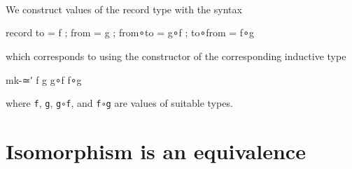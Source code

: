 \begin{fence}
\begin{code}
\>[0]\AgdaSpace{}%
\AgdaSymbol{(}\AgdaSpace{}%
\AgdaSpace{}%
\AgdaSpace{}%
\AgdaSpace{}%
\AgdaSymbol{)}\AgdaSpace{}%
\AgdaSymbol{=}\AgdaSpace{}%
\<%
\\
%
\\[\AgdaEmptyExtraSkip]%
\>[0]\AgdaSpace{}%
\AgdaSymbol{:}\AgdaSpace{}%
\AgdaSpace{}%
\AgdaSymbol{\{}\AgdaSpace{}%
\AgdaSpace{}%
\AgdaSymbol{:}\AgdaSpace{}%
\AgdaSymbol{\}}\AgdaSpace{}%
\AgdaSpace{}%
\AgdaSymbol{(}\AgdaSpace{}%
\AgdaSymbol{:}\AgdaSpace{}%
\AgdaSpace{}%
\AgdaSpace{}%
\AgdaSymbol{)}\AgdaSpace{}%
\AgdaSpace{}%
\AgdaSpace{}%
\AgdaSymbol{(}\AgdaSpace{}%
\AgdaSymbol{:}\AgdaSpace{}%
\AgdaSymbol{)}\AgdaSpace{}%
\AgdaSpace{}%
\AgdaSpace{}%
\AgdaSpace{}%
\AgdaSymbol{(}\AgdaSpace{}%
\AgdaSpace{}%
\AgdaSymbol{)}\AgdaSpace{}%
\AgdaSpace{}%
\AgdaSymbol{)}\<%
\\
\>[0]\AgdaSpace{}%
\AgdaSymbol{(}\AgdaSpace{}%
\AgdaSpace{}%
\AgdaSpace{}%
\AgdaSpace{}%
\AgdaSymbol{)}\AgdaSpace{}%
\AgdaSymbol{=}\AgdaSpace{}%
\<%
\end{code}
\end{fence}

We construct values of the record type with the syntax

\begin{myDisplay}
record
  { to    = f
  ; from  = g
  ; from∘to = g∘f
  ; to∘from = f∘g
  }
\end{myDisplay}

which corresponds to using the constructor of the corresponding
inductive type

\begin{myDisplay}
mk-≃′ f g g∘f f∘g
\end{myDisplay}

where \texttt{f}, \texttt{g}, \texttt{g∘f}, and \texttt{f∘g} are values
of suitable types.

\hypertarget{isomorphism-is-an-equivalence}{%
\section{Isomorphism is an
equivalence}\label{isomorphism-is-an-equivalence}}

